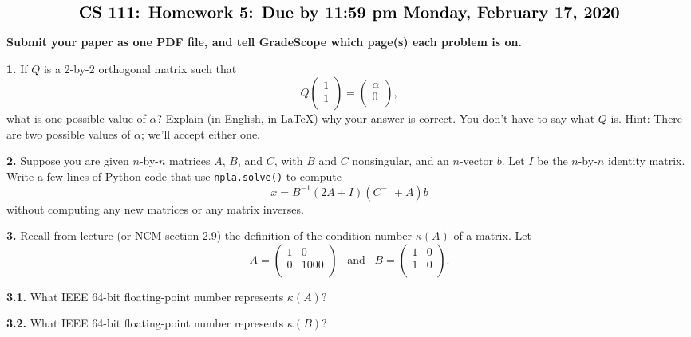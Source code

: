 \documentclass[11pt]{article}
\begin{document}
$$\mbox{\Large \bf CS 111: Homework 5: Due by 11:59 pm Monday, February 17, 2020}$$
\par\smallskip\noindent
{\bf Submit your paper as one PDF file,
and tell GradeScope which page(s) each problem is on.}

\par\bigskip
{\bf 1.}
If $Q$ is a 2-by-2 orthogonal matrix such that
$$
   Q
   \left(
   \begin{array}{c}
    1 \\ 	
    1 \\ 
   \end{array} \right) 
   =
   \left(
   \begin{array}{c}
   \alpha \\ 	
    0 \\ 
   \end{array} \right),
$$
what is one possible value of $\alpha$? 
Explain (in English, in LaTeX) why your answer is correct.
You don't have to say what $Q$ is.
Hint: There are two possible values of $\alpha$; 
we'll accept either one.

\par\bigskip
{\bf 2.}
Suppose you are given $n$-by-$n$ matrices $A$, $B$, and $C$, 
with $B$ and $C$ nonsingular, and an $n$-vector $b$.
Let $I$ be the $n$-by-$n$ identity matrix.
Write a few lines of Python code that use {\tt npla.solve()} to compute
$$ x = B^{-1} (2A+I)(C^{-1}+A)b $$
without computing any new matrices or any matrix inverses.

\par\bigskip
{\bf 3.}
Recall from lecture (or NCM section 2.9) the definition of
the condition number $\kappa(A)$ of a matrix. Let
$$
   A =
   \left(
   \begin{array}{cc}
    1 & 0 \\ 	
    0 & 1000 \\ 
   \end{array} \right)
   \hspace{10pt}
   \mbox{and}
   \hspace{10pt}
   B =
   \left(
   \begin{array}{cc}
    1 & 0 \\ 	
    1 & 0 \\ 
   \end{array} \right).
$$

{\bf 3.1.}
What IEEE 64-bit floating-point number represents $\kappa(A)$?

\par\medskip
{\bf 3.2.}
What IEEE 64-bit floating-point number represents $\kappa(B)$?
\end{document}
